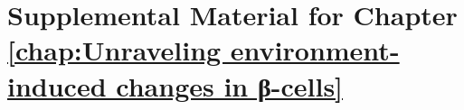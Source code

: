 \appendix{}

\chapter{Supplemental Material for Chapter \ref{chap:Unraveling environment-induced changes in β-cells}}
